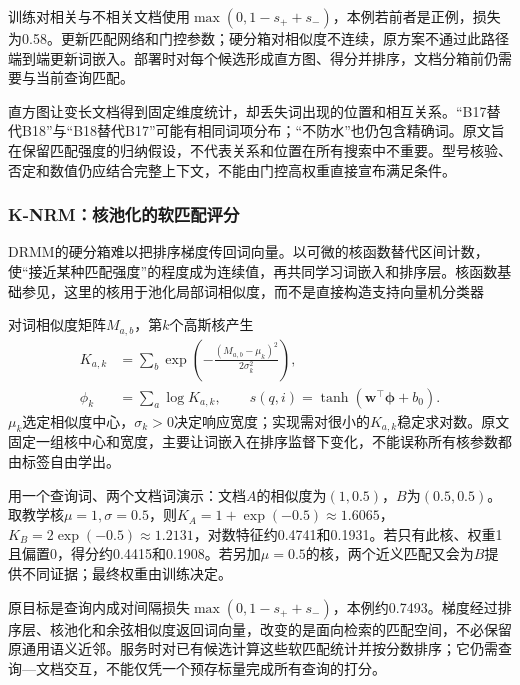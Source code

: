 训练对相关与不相关文档使用$\max(0,1-s_++s_-)$，本例若前者是正例，损失为0.58。更新匹配网络和门控参数；硬分箱对相似度不连续，原方案不通过此路径端到端更新词嵌入。部署时对每个候选形成直方图、得分并排序，文档分箱前仍需要与当前查询匹配。

直方图让变长文档得到固定维度统计，却丢失词出现的位置和相互关系。“B17替代B18”与“B18替代B17”可能有相同词项分布；“不防水”也仍包含精确词。原文旨在保留匹配强度的归纳假设，不代表关系和位置在所有搜索中不重要。型号核验、否定和数值仍应结合完整上下文，不能由门控高权重直接宣布满足条件。

\Needspace{100mm}
\subsubsection{K-NRM：核池化的软匹配评分}
\label{sec:rs-search-knrm}

DRMM的硬分箱难以把排序梯度传回词向量。以可微的核函数替代区间计数，使“接近某种匹配强度”的程度成为连续值，再共同学习词嵌入和排序层。核函数基础参见，这里的核用于池化局部词相似度，而不是直接构造支持向量机分类器

对词相似度矩阵$M_{a,b}$，第$k$个高斯核产生
\begin{equation}
 \begin{split}
 K_{a,k}&=\sum_b\exp\left(-\frac{(M_{a,b}-\mu_k)^2}{2\sigma_k^2}\right),\\
 \phi_k&=\sum_a\log K_{a,k},\qquad
 s(q,i)=\tanh(\bm w^\top\bm\phi+b_0).
 \end{split}
 \label{eq:rs-search-knrm}
\end{equation}
$\mu_k$选定相似度中心，$\sigma_k>0$决定响应宽度；实现需对很小的$K_{a,k}$稳定求对数。原文固定一组核中心和宽度，主要让词嵌入在排序监督下变化，不能误称所有核参数都由标签自由学出。

用一个查询词、两个文档词演示：文档$A$的相似度为$(1,0.5)$，$B$为$(0.5,0.5)$。取教学核$\mu=1,\sigma=0.5$，则$K_A=1+\exp(-0.5)\approx1.6065$，$K_B=2\exp(-0.5)\approx1.2131$，对数特征约0.4741和0.1931。若只有此核、权重1且偏置0，得分约0.4415和0.1908。若另加$\mu=0.5$的核，两个近义匹配又会为$B$提供不同证据；最终权重由训练决定。

原目标是查询内成对间隔损失$\max(0,1-s_++s_-)$，本例约0.7493。梯度经过排序层、核池化和余弦相似度返回词向量，改变的是面向检索的匹配空间，不必保留原通用语义近邻。服务时对已有候选计算这些软匹配统计并按分数排序；它仍需查询—文档交互，不能仅凭一个预存标量完成所有查询的打分。

